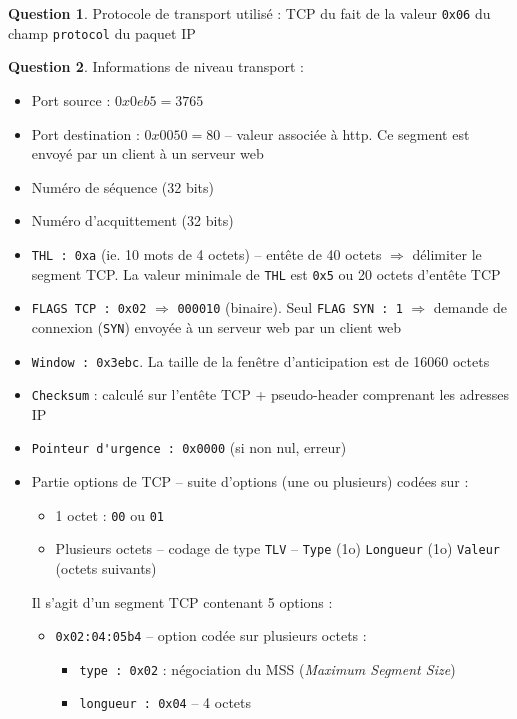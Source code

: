 \documentclass[11pt,english,french]{scrreprt}
\theoremstyle{remark}
\theoremstyle{definition}
\newtheorem{ques}{Question}[section]
\begin{document}
\begin{ques}
	Protocole de transport utilisé : TCP du fait de la valeur \lstinline!0x06! du champ \lstinline!protocol! du paquet IP
\end{ques}

\begin{ques}
	Informations de niveau transport :\begin{itemize}
		\item Port source : $0x0eb5 = 3765$
		\item Port destination : $0x0050 = 80$ -- valeur associée à http. Ce segment est envoyé par un client à un serveur web
		\item Numéro de séquence (32 bits)
		\item Numéro d'acquittement (32 bits)
		\item \lstinline!THL : 0xa! (ie. 10 mots de 4 octets) -- entête de 40 octets $\Rightarrow$ délimiter le segment TCP. La valeur minimale de \lstinline!THL! est \lstinline!0x5! ou 20 octets d'entête TCP
		\item \lstinline!FLAGS TCP : 0x02! $\Rightarrow$ \lstinline!000010! (binaire). Seul \lstinline!FLAG SYN : 1! $\Rightarrow$ demande de connexion (\lstinline!SYN!) envoyée à un serveur web par un client web
		\item \lstinline!Window : 0x3ebc!. La taille de la fenêtre d'anticipation est de 16060 octets
		\item \lstinline!Checksum! : calculé sur l'entête TCP + pseudo-header comprenant les adresses IP
		\item \lstinline!Pointeur d'urgence : 0x0000! (si non nul, erreur)
		\item Partie options de TCP -- suite d'options (une ou plusieurs) codées sur : \begin{itemize}
			\item 1 octet : \lstinline!00! ou \lstinline!01!
			\item Plusieurs octets -- codage de type \lstinline!TLV! -- \lstinline!Type! (1o) \lstinline!Longueur! (1o) \lstinline!Valeur! (octets suivants)
		\end{itemize}
		Il s'agit d'un segment TCP contenant 5 options :\begin{itemize}
			\item \lstinline!0x02:04:05b4! -- option codée sur plusieurs octets :\begin{itemize}
				\item \lstinline!type : 0x02! : négociation du MSS (\emph{Maximum Segment Size})
				\item \lstinline!longueur : 0x04! -- 4 octets

\end{itemize}
\end{itemize}
\end{itemize}
\end{ques}
\end{document}
